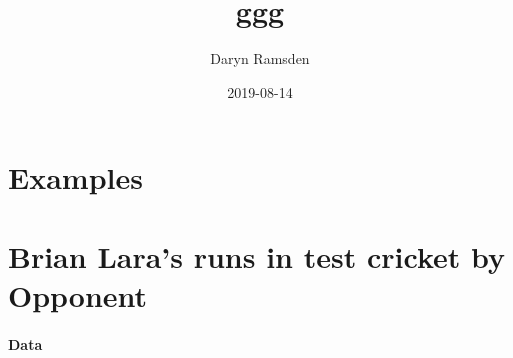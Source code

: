 \documentclass[]{book}
\title{ggg}
\author{Daryn Ramsden}
\date{2019-08-14}
\begin{document}
\maketitle

{
\setcounter{tocdepth}{1}
\tableofcontents
}
\hypertarget{examples}{%
\chapter*{Examples}\label{examples}}

\leavevmode\hypertarget{unemp1tn}{}%

\leavevmode\hypertarget{unemp2tn}{}%

\leavevmode\hypertarget{unemp3tn}{}%

\leavevmode\hypertarget{unemp4tn}{}%

\leavevmode\hypertarget{appletn}{}%

\leavevmode\hypertarget{budgettn}{}%

\leavevmode\hypertarget{atptn}{}%

\leavevmode\hypertarget{wtatn}{}%

\leavevmode\hypertarget{sptn}{}%

\leavevmode\hypertarget{sptn}{}%

\leavevmode\hypertarget{tfwrtn}{}%

\leavevmode\hypertarget{lifeexcountriestn}{}%

\leavevmode\hypertarget{metsbartn}{}%

\leavevmode\hypertarget{nleastbarstn}{}%

\leavevmode\hypertarget{nleastgamesabovetn}{}%

\leavevmode\hypertarget{chihisttn}{}%

\leavevmode\hypertarget{chicomphisttn}{}%

\leavevmode\hypertarget{nhanestn}{}%

\leavevmode\hypertarget{chideptboxtn}{}%

\leavevmode\hypertarget{chiridgestn}{}%

\hypertarget{lara}{%
\chapter*{Brian Lara's runs in test cricket by Opponent}\label{lara}}

\hypertarget{laradata}{%
\subsubsection*{Data}\label{laradata}}
\end{document}
